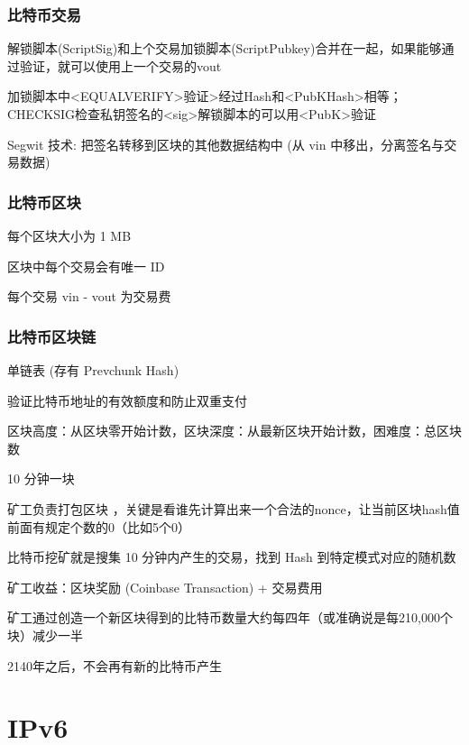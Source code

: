 \documentclass[UTF8,cs4size]{ctexart}
\begin{document}
\subsubsection{比特币交易}
\begin{compactitem}
  \item 解锁脚本(ScriptSig)和上个交易加锁脚本(ScriptPubkey)合并在一起，如果能够通过验证，就可以使用上一个交易的vout
  \item 加锁脚本中<EQUALVERIFY>验证>经过Hash和<PubKHash>相等；CHECKSIG检查私钥签名的<sig>解锁脚本的可以用<PubK>验证
  \item Segwit 技术: 把签名转移到区块的其他数据结构中 (从 vin 中移出，分离签名与交易数据)
\end{compactitem}
\subsubsection{比特币区块}
\begin{compactitem}
  \item 每个区块大小为 1 MB
  \item 区块中每个交易会有唯一 ID
  \item 每个交易 vin - vout 为交易费
\end{compactitem}
\subsubsection{比特币区块链}
\begin{compactitem}
  \item 单链表 (存有 Prevchunk Hash)
  \item 验证比特币地址的有效额度和防止双重支付
  \item 区块高度：从区块零开始计数，区块深度：从最新区块开始计数，困难度：总区块数
  \item 10 分钟一块
  \item 矿工负责打包区块 ，关键是看谁先计算出来一个合法的nonce，让当前区块hash值前面有规定个数的0（比如5个0）
  \item 比特币挖矿就是搜集 10 分钟内产生的交易，找到 Hash 到特定模式对应的随机数
  \item 矿工收益：区块奖励 (Coinbase Transaction) + 交易费用
  \item 矿工通过创造一个新区块得到的比特币数量大约每四年（或准确说是每210,000个块）减少一半
  \item 2140年之后，不会再有新的比特币产生
\end{compactitem}
\clearpage

\section{IPv6}
\end{document}
